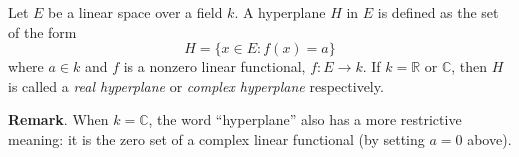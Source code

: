 \documentclass[12pt]{article}
\begin{document}
Let $E$ be a linear space over a field $k$.  A hyperplane $H$ in $E$ is defined as the set of the form $$H=\{x\in E:f(x)=a\}$$ where  $a \in k$ and $f$ is a nonzero linear functional, $f \colon E \to k$.  If $k=\mathbb{R}$ or $\mathbb{C}$, then $H$ is called a \emph{real hyperplane} or \emph{complex hyperplane} respectively.

\textbf{Remark}.  When $k=\mathbb{C}$, the word ``hyperplane'' also has a more restrictive meaning: it is the zero set of a complex linear functional (by setting $a=0$ above).
\end{document}

